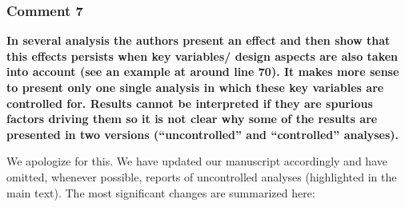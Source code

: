 \documentclass[
]{article}
\begin{document}
\hypertarget{comment-7-1}{%
\subsubsection{Comment 7}\label{comment-7-1}}

\textbf{In several analysis the authors present an effect and then show
that this effects persists when key variables/ design aspects are also
taken into account (see an example at around line 70). It makes more
sense to present only one single analysis in which these key variables
are controlled for. Results cannot be interpreted if they are spurious
factors driving them so it is not clear why some of the results are
presented in two versions (``uncontrolled'' and ``controlled''
analyses).}

We apologize for this. We have updated our manuscript accordingly and
have omitted, whenever possible, reports of uncontrolled analyses
(highlighted in the main text). The most significant changes are
summarized here:
\end{document}
